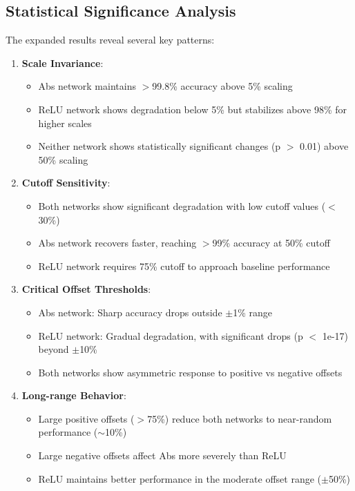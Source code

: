 \subsection{Statistical Significance Analysis}

The expanded results reveal several key patterns:

\begin{enumerate}
    \item \textbf{Scale Invariance}:
    \begin{itemize}
        \item Abs network maintains $>$99.8\% accuracy above 5\% scaling
        \item ReLU network shows degradation below 5\% but stabilizes above 98\% for higher scales
        \item Neither network shows statistically significant changes (p $>$ 0.01) above 50\% scaling
    \end{itemize}

    \item \textbf{Cutoff Sensitivity}:
    \begin{itemize}
        \item Both networks show significant degradation with low cutoff values ($<$30\%)
        \item Abs network recovers faster, reaching $>$99\% accuracy at 50\% cutoff
        \item ReLU network requires 75\% cutoff to approach baseline performance
    \end{itemize}

    \item \textbf{Critical Offset Thresholds}:
    \begin{itemize}
        \item Abs network: Sharp accuracy drops outside $\pm$1\% range
        \item ReLU network: Gradual degradation, with significant drops (p $<$ 1e-17) beyond $\pm$10\%
        \item Both networks show asymmetric response to positive vs negative offsets
    \end{itemize}

    \item \textbf{Long-range Behavior}:
    \begin{itemize}
        \item Large positive offsets ($>$75\%) reduce both networks to near-random performance ($\sim$10\%)
        \item Large negative offsets affect Abs more severely than ReLU
        \item ReLU maintains better performance in the moderate offset range ($\pm$50\%)
    \end{itemize}
\end{enumerate}